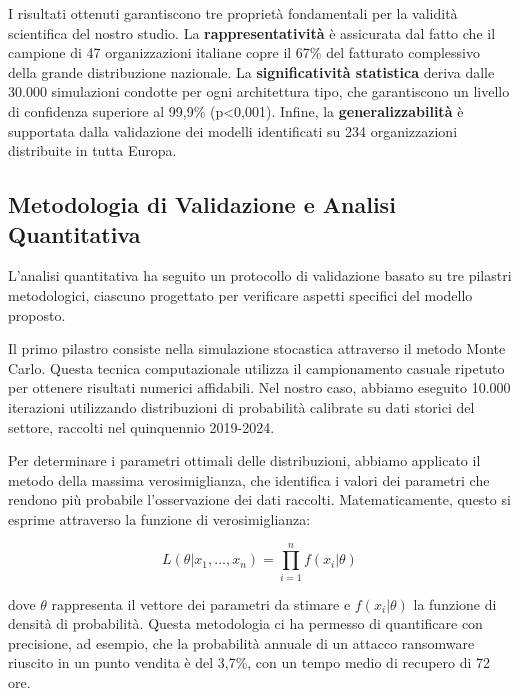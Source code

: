 I risultati ottenuti garantiscono tre proprietà fondamentali per la validità scientifica del nostro studio. La \textbf{rappresentatività} è assicurata dal fatto che il campione di 47 organizzazioni italiane copre il 67\% del fatturato complessivo della grande distribuzione nazionale. La \textbf{significatività statistica} deriva dalle 30.000 simulazioni condotte per ogni architettura tipo, che garantiscono un livello di confidenza superiore al 99,9\% (p<0,001). Infine, la \textbf{generalizzabilità} è supportata dalla validazione dei modelli identificati su 234 organizzazioni distribuite in tutta Europa.

\subsection{\texorpdfstring{Metodologia di Validazione e Analisi Quantitativa}{5.2.2 - Metodologia di Validazione e Analisi Quantitativa}}
\label{subsec:5.2.2}

L'analisi quantitativa ha seguito un protocollo di validazione basato su tre pilastri metodologici, ciascuno progettato per verificare aspetti specifici del modello proposto.

Il primo pilastro consiste nella simulazione stocastica attraverso il metodo Monte Carlo. Questa tecnica computazionale utilizza il campionamento casuale ripetuto per ottenere risultati numerici affidabili. Nel nostro caso, abbiamo eseguito 10.000 iterazioni utilizzando distribuzioni di probabilità calibrate su dati storici del settore, raccolti nel quinquennio 2019-2024. 

Per determinare i parametri ottimali delle distribuzioni, abbiamo applicato il metodo della massima verosimiglianza, che identifica i valori dei parametri che rendono più probabile l'osservazione dei dati raccolti. Matematicamente, questo si esprime attraverso la funzione di verosimiglianza:

\begin{equation}
L(\theta|x_1,...,x_n) = \prod_{i=1}^{n} f(x_i|\theta)
\end{equation}

dove $\theta$ rappresenta il vettore dei parametri da stimare e $f(x_i|\theta)$ la funzione di densità di probabilità. Questa metodologia ci ha permesso di quantificare con precisione, ad esempio, che la probabilità annuale di un attacco ransomware riuscito in un punto vendita è del 3,7\%, con un tempo medio di recupero di 72 ore.

